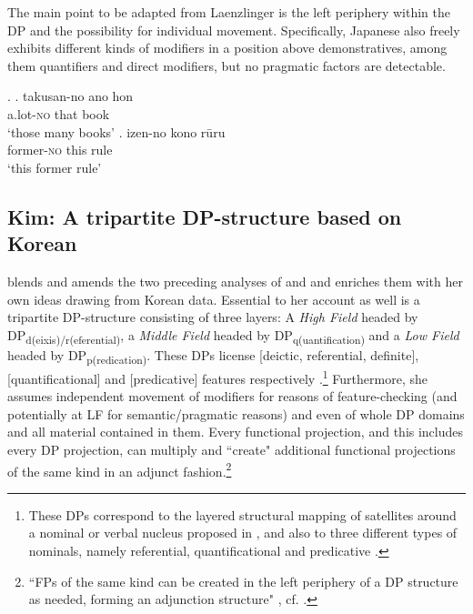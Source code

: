 The main point to be adapted from Laenzlinger is the left periphery within the DP and the possibility for individual movement. Specifically, Japanese also freely exhibits different kinds of modifiers in a position above demonstratives, among them quantifiers and direct modifiers, but no pragmatic factors are detectable.

\ex. \ag. takusan-no ano hon\\
a.lot-\textsc{no} that book\\
`those many books’
\bg. izen-no kono rūru\\
former-\textsc{no} this rule\\
`this former rule’

\subsection{Kim: A tripartite DP-structure based on Korean} \label{kimsaccount}

\citet{kim:2019:syntax} blends and amends the two preceding analyses of \citet{svenonius:2008:position} and \citet{laenzlinger:2005:french} and enriches them with her own ideas drawing from  Korean data. Essential to her account as well is a tripartite DP-structure consisting of three layers: A \textit{High Field} headed by DP\textsubscript{d(eixis)/r(eferential)}, a \textit{Middle Field} headed by DP\textsubscript{q(uantification)} and a \textit{Low Field} headed by DP\textsubscript{p(redication)}. These DPs license [deictic, referential, definite], [quantificational] and [predicative] features respectively \citep[123]{kim:2019:syntax}.\footnote{These DPs correspond to the layered structural mapping of satellites around a nominal or verbal nucleus proposed in \citet[218]{rijkhoff:2002:noun}, and also to three different types of nominals, namely referential, quantificational and predicative \citep[114]{kim:2019:syntax}.} Furthermore, she assumes independent movement of modifiers for reasons of feature-checking (and potentially at LF for semantic/pragmatic reasons) and even of whole DP domains and all material contained in them. Every functional projection, and this includes every DP projection, can multiply and ``create" additional functional projections of the same kind in an adjunct fashion.\footnote{``FPs of the same kind can be created in the left periphery of a DP structure as needed, forming an adjunction structure" \citep[121]{kim:2019:syntax}, cf. \citet{koopman:2000:verbal}.}

